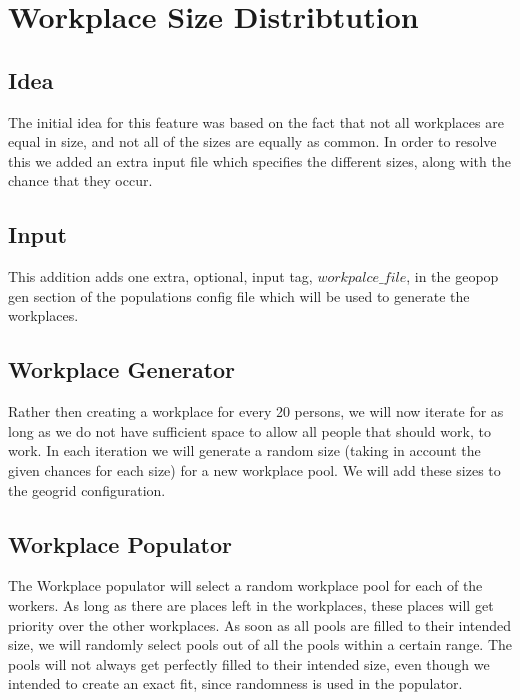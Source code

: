
\section{Workplace Size Distribtution}
\label{section:WorkplaceSizeDistribution}

\subsection{Idea}
The initial idea for this feature was based on the fact that not all workplaces are equal in size, and not all of the sizes are equally as common. In order to resolve this we added an extra input file which specifies the different sizes, along with the chance that they occur.

\subsection{Input}
This addition adds one extra, optional, input tag, $workpalce\_file$, in the geopop gen section of the populations config file which will be used to generate the workplaces.

\subsection{Workplace Generator}
Rather then creating a workplace for every 20 persons, we will now iterate for as long as we do not have sufficient space to allow all people that should work, to work. In each iteration we will generate a random size (taking in account the given chances for each size) for a new workplace pool. We will add these sizes to the geogrid configuration.

\subsection{Workplace Populator}
The Workplace populator will select a random workplace pool for each of the workers. As long as there are places left in the workplaces, these places will get priority over the other workplaces. As soon as all pools are filled to their intended size, we will randomly select pools out of all the pools within a certain range. The pools will not always get perfectly filled to their intended size, even though we intended to create an exact fit, since randomness is used in the populator.
